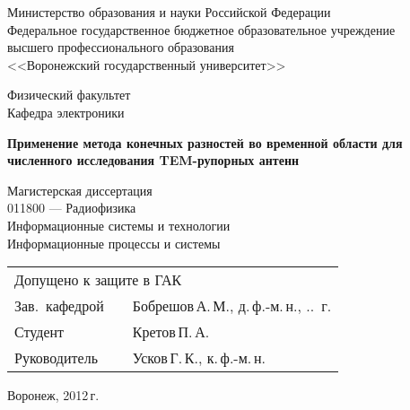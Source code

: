 %
%

\begin{titlepage}
\centering
Министерство образования и науки Российской Федерации\\
Федеральное государственное бюджетное образовательное учреждение\\
высшего профессионального образования\\
<<Воронежский государственный университет>>\\

\vspace{10mm}

Физический факультет\\
Кафедра электроники

\vspace{50mm}

\textbf{
    Применение метода конечных разностей во временной области
    для численного исследования TEM-рупорных антенн}

\vspace{10mm}
Магистерская диссертация\\
\vspace{10mm}
011800 --- Радиофизика\\
Информационные системы и технологии\\
Информационные процессы и системы\\

\vspace{20mm}
\begin{tabularx}{\textwidth}{lll}
\multicolumn{3}{l}{Допущено к защите в ГАК} \\[5mm]
Зав.~кафедрой & \hspace{35mm} & Бобрешов\,А.\,М., д.\,ф.-м.\,н.,
\underline{\hspace{5mm}}.\underline{\hspace{5mm}}.\underline{\hspace{10mm}}~г.\\
Студент       & \hspace{35mm} & Кретов\,П.\,А.\\
Руководитель  & \hspace{35mm} & Усков\,Г.\,К., к.\,ф.-м.\,н.\\
\end{tabularx}

\vspace*{\fill}

Воронеж, 2012\,г.
\end{titlepage}
\setcounter{page}{2}
